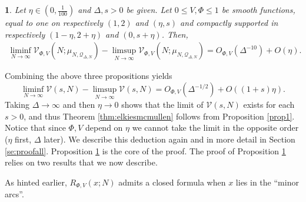 \documentclass[12pt,reqno]{amsart}
\theoremstyle{plain}
\numberwithin{equation}{section}
\numberwithin{figure}{section}
\theoremstyle{plain}
\newtheorem{prop}{\protect\propositionname}
\theoremstyle{definition}
\theoremstyle{remark}
\providecommand{\propositionname}{Proposition}
\begin{document}
\begin{prop} \label{prop2}
  Let $\eta \in (0, \tfrac{1}{100})$ and $\Delta, s > 0$ be given.   
  Let $0 \leq V, \Phi \leq 1$ be smooth functions, equal to one on 
  respectively $(1,2)$ and $(\eta, s)$ and compactly supported in respectively $(1 - \eta, 2 + \eta)$ and $(0, s + \eta)$. Then, 
  \begin{align*}
  \liminf_{N \rightarrow \infty} \mathcal{V}_{\Phi, V}(N; \mu_{N , \mathcal{Q}_{\Delta, N}})
  - \limsup_{N \rightarrow \infty} \mathcal{V}_{\Phi, V} 
  (N; \mu_{N, \mathcal{Q}_{\Delta, N}})  
  = O_{\Phi, V}(\Delta^{-10}) + O(\eta).
  \end{align*}
\end{prop}
Combining the above three propositions yields
$$
\liminf_{N \rightarrow \infty} \mathcal{V}(s, N) - \limsup_{N \rightarrow \infty} \mathcal{V}(s, N) = O_{\Phi, V}(\Delta^{-1/2}) + O((1 + s) \eta).
$$
Taking $\Delta \rightarrow \infty$ and then $\eta \rightarrow 0$ shows that the limit of $\mathcal{V}(s, N)$ exists for each $s > 0$, and thus Theorem \ref{thm:elkiesmcmullen} follows from Proposition \ref{prop1}. Notice that since $\Phi, V$ depend on $\eta$ we cannot take the limit in the opposite order ($\eta$ first, $\Delta$ later). We describe this deduction again and in more detail in Section \ref{se:proofall}.
Proposition \ref{prop2} is the core of the proof. The proof of Proposition \ref{prop2} relies on two results that we now describe. 

As hinted earlier, 
  $R_{\Phi, V}(x; N)$ admits a closed formula when $x$ lies in the ``minor arcs''. 
  
\end{document}
